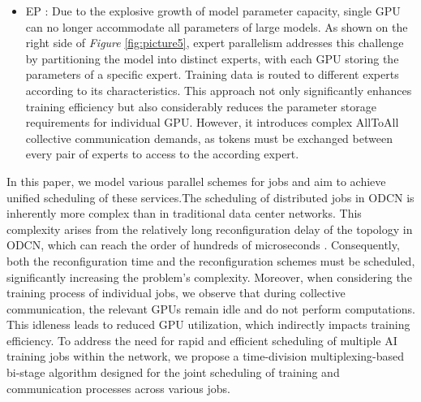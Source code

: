 \documentclass[conference]{IEEEtran}
\begin{document}
\begin{itemize}
	
	\item EP \cite{MoE}: Due to the explosive growth of model parameter capacity, single GPU can no longer accommodate all parameters of large models. As shown on the right side of \emph{Figure} \ref{fig:picture5}, expert parallelism addresses this challenge by partitioning the model into distinct experts, with each GPU storing the parameters of a specific expert. Training data is routed to different experts according to its characteristics. This approach not only significantly enhances training efficiency but also considerably reduces the parameter storage requirements for individual GPU. However, it introduces complex AllToAll collective communication demands, as tokens must be exchanged between every pair of experts to access to the according expert. 
\end{itemize}


In this paper, we model various parallel schemes for jobs and aim to achieve unified scheduling of these services.The scheduling of distributed jobs in ODCN is inherently more complex than in traditional data center networks. This complexity arises from the relatively long reconfiguration delay of the topology in ODCN, which can reach the order of hundreds of microseconds \cite{Zerwas2021}. Consequently, both the reconfiguration time and the reconfiguration schemes must be scheduled, significantly increasing the problem's complexity. Moreover, when considering the training process of individual jobs, we observe that during collective communication, the relevant GPUs remain idle and do not perform computations. This idleness leads to reduced GPU utilization, which indirectly impacts training efficiency. To address the need for rapid and efficient scheduling of multiple AI training jobs within the network, we propose a time-division multiplexing-based bi-stage algorithm designed for the joint scheduling of training and communication processes across various jobs.
\end{document}

